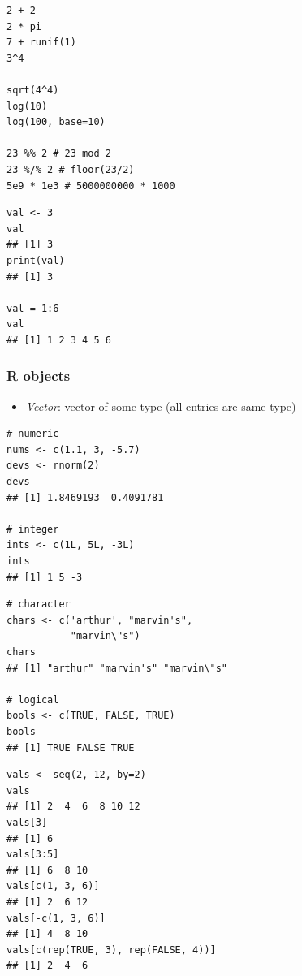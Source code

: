 \documentclass[10pt,c]{beamer}
\newenvironment{changemargin}[1]{
  \begin{list}{}{
    \setlength{\topsep}{0pt}
    \setlength{\leftmargin}{#1}
    \setlength{\rightmargin}{#1}
    \setlength{\listparindent}{\parindent}
    \setlength{\itemindent}{\parindent}
    \setlength{\parsep}{\parskip}
  }
  \item[]}{\end{list}}
\begin{document}
\begin{frame}
\begin{changemargin}{2.5em}
\begin{lstlisting}
2 + 2
2 * pi
7 + runif(1)
3^4

sqrt(4^4)
log(10)
log(100, base=10)

23 %% 2 # 23 mod 2
23 %/% 2 # floor(23/2)
5e9 * 1e3 # 5000000000 * 1000
\end{lstlisting}
\end{changemargin}
\end{frame}
\begin{frame}
\begin{changemargin}{2.5em}
\begin{lstlisting}
val <- 3
val
## [1] 3
print(val)
## [1] 3

val = 1:6
val
## [1] 1 2 3 4 5 6
\end{lstlisting}
\end{changemargin}
\end{frame}
\begin{frame}
\frametitle{R objects}
\begin{itemize}
\item \emph{Vector}: vector of some type (all entries are same type)
\end{itemize}
\end{frame}
\begin{frame}
\begin{changemargin}{2.5em}
\begin{lstlisting}
# numeric
nums <- c(1.1, 3, -5.7)
devs <- rnorm(2)
devs
## [1] 1.8469193  0.4091781

# integer
ints <- c(1L, 5L, -3L)
ints
## [1] 1 5 -3
\end{lstlisting}
\end{changemargin}
\end{frame}
\begin{frame}
\begin{changemargin}{-1.0em}
\begin{lstlisting}
# character
chars <- c('arthur', "marvin's",
           "marvin\"s")
chars
## [1] "arthur" "marvin's" "marvin\"s"

# logical
bools <- c(TRUE, FALSE, TRUE)
bools
## [1] TRUE FALSE TRUE
\end{lstlisting}
\end{changemargin}
\end{frame}
\begin{frame}
\begin{changemargin}{-1.0em}
\begin{lstlisting}
vals <- seq(2, 12, by=2)
vals
## [1] 2  4  6  8 10 12
vals[3]
## [1] 6
vals[3:5]
## [1] 6  8 10
vals[c(1, 3, 6)]
## [1] 2  6 12
vals[-c(1, 3, 6)]
## [1] 4  8 10
vals[c(rep(TRUE, 3), rep(FALSE, 4))]
## [1] 2  4  6
\end{lstlisting}
\end{changemargin}
\end{frame}
\end{document}
